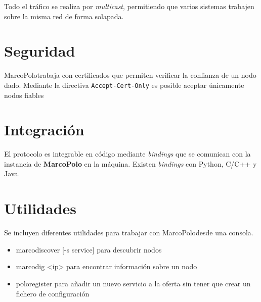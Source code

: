 \documentclass{article}
\newcommand{\nombre}{MarcoPolo}
\begin{document}
Todo el tráfico se realiza por \textit{multicast}, permitiendo que varios sistemas trabajen sobre la misma red de forma solapada.

\section{Seguridad}

\nombre trabaja con certificados que permiten verificar la confianza de un nodo dado. Mediante la directiva \texttt{Accept-Cert-Only} es posible aceptar únicamente nodos fiables

\section{Integración}

El protocolo es integrable en código mediante \textit{bindings} que se comunican con la instancia de \textbf{\nombre} en la máquina.
Existen \textit{bindings} con Python, C/C++ y Java.

\section{Utilidades}

Se incluyen diferentes utilidades para trabajar con \nombre desde una consola.

\begin{itemize}
  \item marcodiscover [-s service] para descubrir nodos
  \item marcodig <ip> para encontrar información sobre un nodo
  \item poloregister para añadir un nuevo servicio a la oferta sin tener que crear un fichero de configuración
\end{itemize}







%


%

%
\end{document}
